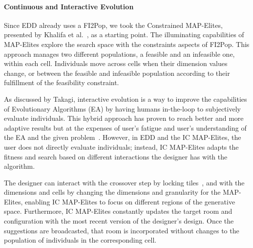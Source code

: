 \paragraph{Continuous and Interactive Evolution}



Since EDD already uses a FI2Pop, we took the Constrained MAP-Elites, presented by Khalifa et al.~, as a starting point. The illuminating capabilities of MAP-Elites explore the search space with the constraints aspects of FI2Pop. This approach manages two different populations, a feasible and an infeasible one, within each cell. Individuals move across cells when their dimension values change, or between the feasible and infeasible population according to their fulfillment of the feasibility constraint.

As discussed by Takagi, interactive evolution is a way to improve the capabilities of Evolutionary Algorithms (EA) by having humans in-the-loop to subjectively evaluate individuals. This hybrid approach has proven to reach better and more adaptive results but at the expenses of user's fatigue and user's understanding of the EA and the given problem~. However, in EDD and the IC MAP-Elites, the user does not directly evaluate individuals; instead, IC MAP-Elites adapts the fitness and search based on different interactions the designer has with the algorithm. 

The designer can interact with the crossover step by locking tiles~, and with the dimensions and cells by changing the dimensions and granularity for the MAP-Elites, enabling IC MAP-Elites to focus on different regions of the generative space. Furthermore, IC MAP-Elites constantly updates the target room and configuration with the most recent version of the designer's design. Once the suggestions are broadcasted, that room is incorporated without changes to the population of individuals in the corresponding cell.

